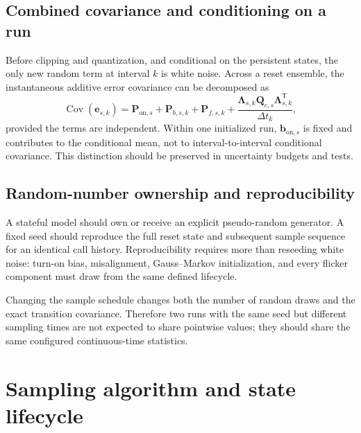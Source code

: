\documentclass[11pt,oneside,headings=big]{scrreprt}
\newcommand{\Cov}{\operatorname{Cov}}
\newcommand{\transpose}{\mathsf{T}}
\newcommand{\vect}[1]{\bm{#1}}
\newcommand{\mat}[1]{\bm{#1}}
\begin{document}
    \section{Combined covariance and conditioning on a run}
    Before clipping and quantization, and conditional on the persistent states, the
    only new random term at interval \(k\) is white noise. Across a reset ensemble,
    the instantaneous additive error covariance can be decomposed as
    \begin{equation}
        \Cov(\vect e_{s,k})
        =\mat P_{\mathrm{on},s}
        +\mat P_{b,s,k}
        +\mat P_{f,s,k}
        +\frac{\mat\Lambda_{s,k}\mat Q_{c,s}
            \mat\Lambda_{s,k}^\transpose}{\Delta t_k},
        \label{eq:combined-cov}
    \end{equation}
    provided the terms are independent. Within one initialized run,
    \(\vect b_{\mathrm{on},s}\) is fixed and contributes to the conditional mean,
    not to interval-to-interval conditional covariance. This distinction should be
    preserved in uncertainty budgets and tests.


    \section{Random-number ownership and reproducibility}
    A stateful model should own or receive an explicit pseudo-random generator. A
    fixed seed should reproduce the full reset state and subsequent sample sequence
    for an identical call history. Reproducibility requires more than reseeding
    white noise: turn-on bias, misalignment, Gauss--Markov initialization, and every
    flicker component must draw from the same defined lifecycle.

    Changing the sample schedule changes both the number of random draws and the
    exact transition covariance. Therefore two runs with the same seed but different
    sampling times are not expected to share pointwise values; they should share the
    same configured continuous-time statistics.


    \chapter{Sampling algorithm and state lifecycle}
    \label{chap:algorithm}
\end{document}
